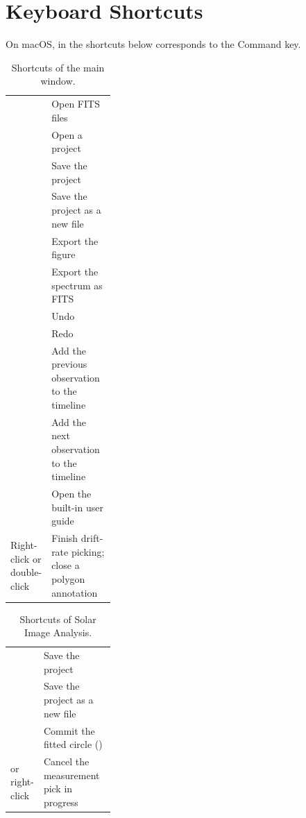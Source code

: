 \chapter{Keyboard Shortcuts}
\label{app:shortcuts}

On macOS,  in the shortcuts below corresponds to the Command key.

\begin{table}[!htbp]
  \centering
  \caption{Shortcuts of the main window.}
  \label{tab:keys-main}
  \small
  \begin{tabularx}{\linewidth}{@{}P{0.3\linewidth}L@{}}
    \toprule
     &  \\
    \midrule
     & Open FITS files \\
     & Open a project \\
     & Save the project \\
     & Save the project as a new file \\
     & Export the figure \\
     & Export the spectrum as FITS \\
     & Undo \\
     & Redo \\
     & Add the previous observation to the timeline \\
     & Add the next observation to the timeline \\
     & Open the built-in user guide \\
    Right-click or double-click & Finish drift-rate picking; close a polygon annotation \\
    \bottomrule
  \end{tabularx}
\end{table}

\begin{table}[!htbp]
  \centering
  \caption{Shortcuts of Solar Image Analysis.}
  \label{tab:keys-solar}
  \small
  \begin{tabularx}{\linewidth}{@{}P{0.3\linewidth}L@{}}
    \toprule
     &  \\
    \midrule
     & Save the project \\
     & Save the project as a new file \\
     & Commit the fitted circle () \\
     or right-click & Cancel the measurement pick in progress \\
    \bottomrule
  \end{tabularx}
\end{table}

